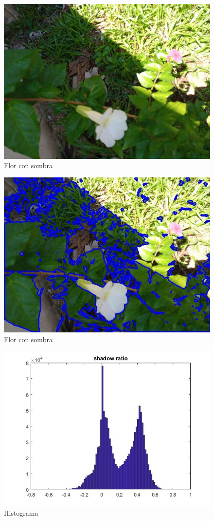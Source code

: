 \begin{figure}
    \includegraphics[width=\textwidth]{Imagenes/Informes/info2_flor.jpg}
     \hfill
     \caption{Flor con sombra}
    \label{Info2}
\end{figure}

\begin{figure}
   \includegraphics[width=\textwidth]{Imagenes/Informes/info2.jpg}
     \hfill
     \caption{Flor con sombra}
    \label{Info2_flor}
\end{figure}

\begin{figure}
    \includegraphics[width=\textwidth]{Imagenes/Informes/info2_histograma.jpg}
     \hfill
     \caption{Histograma}
    \label{Info2_histoflor}
\end{figure}